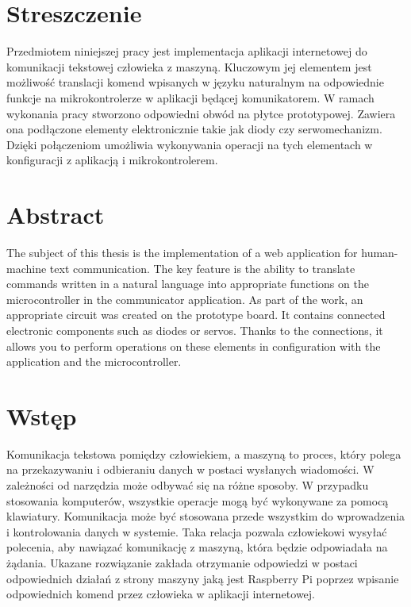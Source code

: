 \section{Streszczenie}
Przedmiotem niniejszej pracy jest implementacja aplikacji internetowej do komunikacji tekstowej człowieka z maszyną. Kluczowym jej elementem jest możliwość translacji komend wpisanych w języku naturalnym na odpowiednie funkcje na mikrokontrolerze w aplikacji będącej komunikatorem. W ramach wykonania pracy stworzono odpowiedni obwód na płytce prototypowej. Zawiera ona podłączone elementy elektronicznie takie jak diody czy serwomechanizm. Dzięki połączeniom umożliwia wykonywania operacji na tych elementach w konfiguracji z aplikacją i mikrokontrolerem.
\section{Abstract}
The subject of this thesis is the implementation of a web application for human-machine text communication. The key feature is the ability to translate commands written in a natural language into appropriate functions on the microcontroller in the communicator application. As part of the work, an appropriate circuit was created on the prototype board. It contains connected electronic components such as diodes or servos. Thanks to the connections, it allows you to perform operations on these elements in configuration with the application and the microcontroller.
\section{Wstęp}
Komunikacja tekstowa pomiędzy człowiekiem, a maszyną to proces, który polega na przekazywaniu i odbieraniu danych w postaci wysłanych wiadomości. W zależności od narzędzia może odbywać się na różne sposoby. W przypadku stosowania komputerów, wszystkie operacje mogą być wykonywane za pomocą klawiatury. Komunikacja może być stosowana przede wszystkim do wprowadzenia i kontrolowania danych w systemie. Taka relacja pozwala człowiekowi wysyłać polecenia, aby nawiązać komunikację z maszyną, która będzie odpowiadała na żądania. Ukazane rozwiązanie zakłada otrzymanie odpowiedzi w postaci odpowiednich działań z strony maszyny jaką jest Raspberry Pi poprzez wpisanie odpowiednich komend przez człowieka w aplikacji internetowej.
